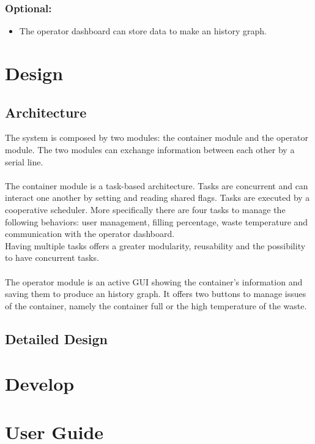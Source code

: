 \documentclass[a4paper,12pt]{report}
\begin{document}
        \subsection{Optional:}
            
            \begin{itemize}
                \item The operator dashboard can store data to make an history graph.
            \end{itemize}

\chapter{Design}

    \section{Architecture}

        The system is composed by two modules: the container module and the operator module.
        The two modules can exchange information between each other by a serial line.\\\\
        The container module is a task-based architecture. Tasks are concurrent and can interact one another by setting and reading shared flags. Tasks are executed by a cooperative scheduler.
        More specifically there are four tasks to manage the following behaviors: user management, filling percentage, waste temperature and communication with the operator dashboard.\\
        Having multiple tasks offers a greater modularity, reusability and the possibility to have concurrent tasks.\\\\
        The operator module is an active GUI showing the container's information and saving them to produce an history graph.
        It offers two buttons to manage issues of the container, namely the container full or the high temperature of the waste.

        \section{Detailed Design}

\chapter{Develop}

\appendix
\chapter{User Guide}
\end{document}
